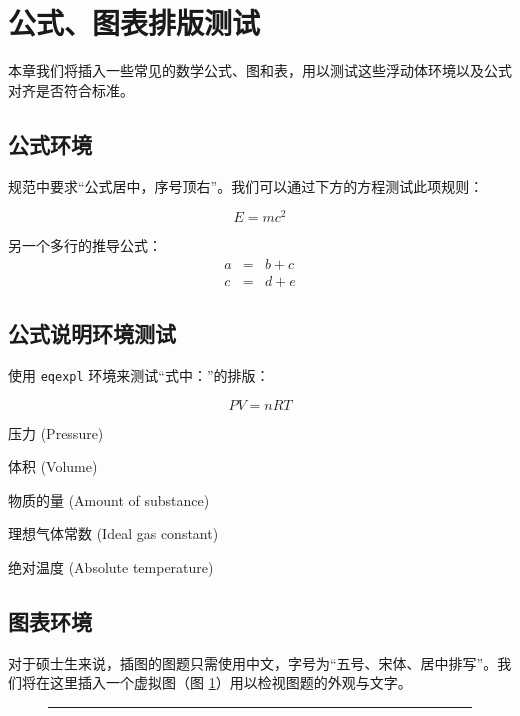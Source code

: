 \section{公式、图表排版测试}
本章我们将插入一些常见的数学公式、图和表，用以测试这些浮动体环境以及公式对齐是否符合标准。

\subsection{公式环境}
规范中要求“公式居中，序号顶右”。我们可以通过下方的方程测试此项规则：

\begin{equation}
  E = m c^2
\end{equation}

另一个多行的推导公式：
\begin{eqnarray}
  a &=& b + c \\
  c &=& d + e
\end{eqnarray}

\subsection{公式说明环境测试}
使用 \texttt{eqexpl} 环境来测试“式中：”的排版：

\begin{equation}
    PV = nRT
\end{equation}

\begin{eqexpl}
    \item[P] 压力 (Pressure)
    \item[V] 体积 (Volume)
    \item[n] 物质的量 (Amount of substance)
    \item[R] 理想气体常数 (Ideal gas constant)
    \item[T] 绝对温度 (Absolute temperature)
\end{eqexpl}

\subsection{图表环境}
对于硕士生来说，插图的图题只需使用中文，字号为“五号、宋体、居中排写”。我们将在这里插入一个虚拟图（图 \ref{fig:test}）用以检视图题的外观与文字。

\begin{figure}[H]
  \centering
  \rule{6cm}{3cm} %
  \label{fig:test}
\end{figure}


